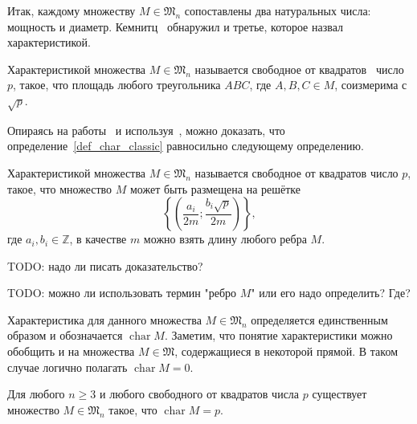 Итак, каждому множеству $M\in\mathfrak{M}_n$ сопоставлены
два натуральных числа: мощность и диаметр.
Кемнитц~\cite{kemnitz1988punktmengen} обнаружил и третье,
которое назвал характеристикой.

\begin{definition}
	\label{def_char_classic}
	Характеристикой множества $M\in\mathfrak{M}_n$ называется свободное от квадратов~\cite[гл. 34, п. 3]{Bukhstab-number-theory}
	число $p$, такое, что площадь любого треугольника $ABC$, где $A,B,C\in M$,
	соизмерима с $\sqrt{p}$.
\end{definition}

Опираясь на работы~\cite{our-mkmitu-2016,our-ped-2017} и используя~\cite[теорема 3.1]{polygons-on-lattices},
можно доказать, что определение~\ref{def_char_classic} равносильно следующему определению.
\begin{definition}
	\label{def_char_classic}
	Характеристикой множества $M\in\mathfrak{M}_n$ называется свободное от квадратов
	число $p$, такое, что множество $M$ может быть размещена на решётке
\begin{equation}\label{grid_for_Erdosh_system}
	\left\{\left(
		\frac{a_i}{2m}
		;
		\frac{b_i\sqrt{p}}{2m}
	\right)\right\},
\end{equation}
где $a_i, b_i \in \mathbb{Z}$, в качестве $m$ можно взять длину любого ребра $M$.
\end{definition}

TODO: надо ли писать доказательство?

TODO: можно ли использовать термин "ребро $M$" или его надо определить? Где?

Характеристика для данного множества $M\in\mathfrak{M}_n$ определяется единственным образом и обозначается $\operatorname{char}M$.
Заметим, что понятие характеристики можно обобщить и на множества $M\in\mathfrak{M}$,
содержащиеся в некоторой прямой.
В таком случае логично полагать $\operatorname{char} M = 0$.



\begin{theorem}
	\label{thm:power_char_exist}
	Для любого $n\geq 3$ и любого свободного от квадратов числа $p$
	существует множество $M\in\mathfrak{M}_n$ такое, что $\operatorname{char} M = p$.
\end{theorem}

